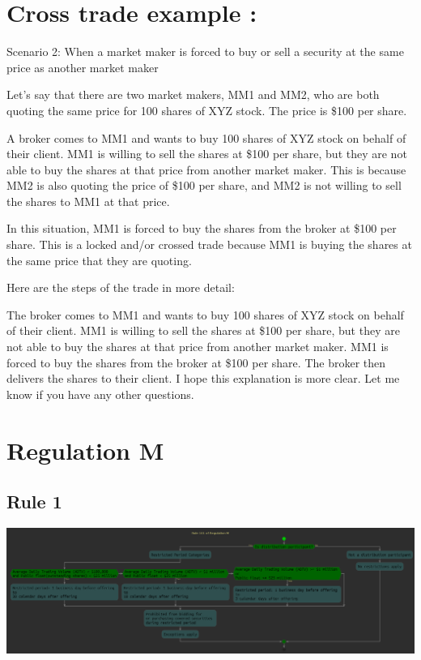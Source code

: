 \documentclass[11pt]{article}
\begin{document}
\section{Cross trade example :}
\label{sec:orgb6449dc}

Scenario 2: When a market maker is forced to buy or sell a security at the same price as another market maker

Let's say that there are two market makers, MM1 and MM2, who are both quoting the same price for 100 shares of XYZ stock. The price is \$100 per share.

A broker comes to MM1 and wants to buy 100 shares of XYZ stock on behalf of their client. MM1 is willing to sell the shares at \$100 per share, but they are not able to buy the shares at that price from another market maker. This is because MM2 is also quoting the price of \$100 per share, and MM2 is not willing to sell the shares to MM1 at that price.

In this situation, MM1 is forced to buy the shares from the broker at \$100 per share. This is a locked and/or crossed trade because MM1 is buying the shares at the same price that they are quoting.

Here are the steps of the trade in more detail:

The broker comes to MM1 and wants to buy 100 shares of XYZ stock on behalf of their client.
MM1 is willing to sell the shares at \$100 per share, but they are not able to buy the shares at that price from another market maker.
MM1 is forced to buy the shares from the broker at \$100 per share.
The broker then delivers the shares to their client.
I hope this explanation is more clear. Let me know if you have any other questions.



\section{Regulation M}
\label{sec:org44944ae}

\subsection{Rule 1}
\label{sec:orga999231}

\begin{center}
\includegraphics[width=.9\linewidth]{./Regulation_M.png}
\end{center}
\end{document}
